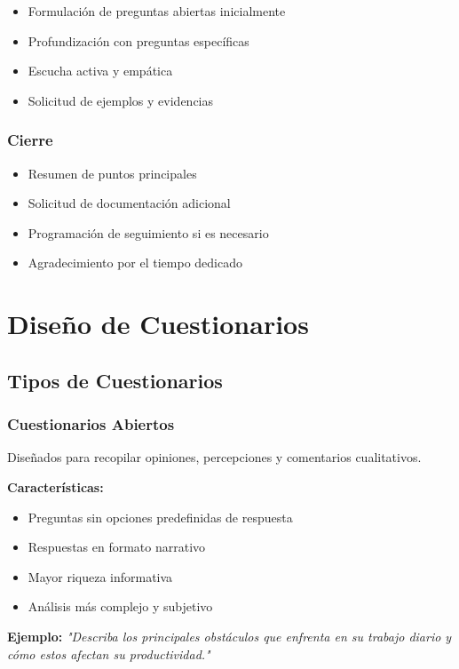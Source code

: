 \documentclass[12pt,letterpaper,oneside]{book}
\begin{document}
\begin{itemize}
\item Formulación de preguntas abiertas inicialmente
\item Profundización con preguntas específicas
\item Escucha activa y empática
\item Solicitud de ejemplos y evidencias
\end{itemize}

\subsubsection{Cierre}

\begin{itemize}
\item Resumen de puntos principales
\item Solicitud de documentación adicional
\item Programación de seguimiento si es necesario
\item Agradecimiento por el tiempo dedicado
\end{itemize}

\section{Diseño de Cuestionarios}

\subsection{Tipos de Cuestionarios}

\subsubsection{Cuestionarios Abiertos}

Diseñados para recopilar opiniones, percepciones y comentarios cualitativos.

\textbf{Características:}
\begin{itemize}
\item Preguntas sin opciones predefinidas de respuesta
\item Respuestas en formato narrativo
\item Mayor riqueza informativa
\item Análisis más complejo y subjetivo
\end{itemize}

\textbf{Ejemplo:}
\textit{"Describa los principales obstáculos que enfrenta en su trabajo diario y cómo estos afectan su productividad."}
\end{document}
